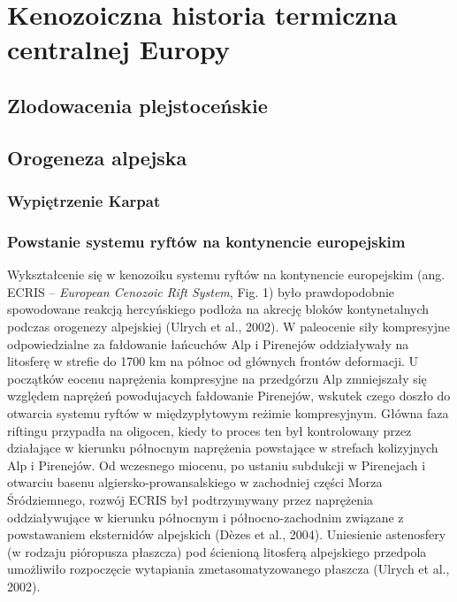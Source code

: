 \documentclass[11.5pt,twoside]{report}
\begin{document}
	
	\tableofcontents
	
	\chapter{Kenozoiczna historia termiczna centralnej Europy}
	
	\section{Zlodowacenia plejstoceńskie}
	
	\section{Orogeneza alpejska}
	
	\subsection{Wypiętrzenie Karpat}
	
	\subsection{Powstanie systemu ryftów na kontynencie europejskim}
	
Wykształcenie się w kenozoiku systemu ryftów na kontynencie europejskim (ang. ECRIS -- \textit{European Cenozoic Rift System}, Fig. 1) było prawdopodobnie spowodowane reakcją hercyńskiego podłoża na akrecję bloków kontynetalnych podczas orogenezy alpejskiej (Ulrych et al., 2002). W paleocenie siły kompresyjne odpowiedzialne za fałdowanie łańcuchów Alp i Pirenejów oddziaływały na litosferę w strefie do 1700 km na północ od głównych frontów deformacji. U początków eocenu naprężenia kompresyjne na przedgórzu Alp zmniejszały się względem naprężeń powodujacych fałdowanie Pirenejów, wskutek czego doszło do otwarcia systemu ryftów w międzypłytowym reżimie kompresyjnym. Główna faza riftingu przypadła na oligocen, kiedy to proces ten był kontrolowany przez działające w kierunku północnym naprężenia powstające w strefach kolizyjnych Alp i Pirenejów. Od wczesnego miocenu, po ustaniu subdukcji w Pirenejach i otwarciu basenu algiersko-prowansalskiego w zachodniej części Morza Śródziemnego, rozwój ECRIS był podtrzymywany przez naprężenia oddziaływujące w kierunku północnym i północno-zachodnim związane z powstawaniem eksternidów alpejskich (D\`{e}zes et al., 2004). Uniesienie astenosfery (w rodzaju pióropusza płaszcza) pod ścienioną litosferą alpejskiego przedpola umożliwiło rozpoczęcie wytapiania zmetasomatyzowanego płaszcza (Ulrych et al., 2002).
\end{document}
